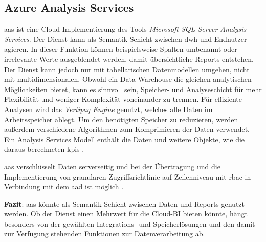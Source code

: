 \subsection{Azure Analysis Services} \label{sec:grundlagen:azure_dienste:analysisServices}
\ac{aas} ist eine Cloud Implementierung des Tools \textit{Microsoft SQL Server Analysis Services}. Der Dienst kann als Semantik-Schicht zwischen \ac{dwh} und Endnutzer agieren. In dieser Funktion können beispielsweise Spalten umbenannt oder irrelevante Werte ausgeblendet werden, damit übersichtliche Reports entstehen. Der Dienst kann jedoch nur mit tabellarischen Datenmodellen umgehen, nicht mit multidimensionalen. Obwohl ein Data Warehouse die gleichen analytischen Möglichkeiten bietet, kann es sinnvoll sein, Speicher- und Analyseschicht für mehr Flexibilität und weniger Komplexität voneinander zu trennen. Für effiziente Analysen wird das \textit{Vertipaq Engine} genutzt, welches alle Daten im Arbeitsspeicher ablegt. Um den benötigten Speicher zu reduzieren, werden außerdem verschiedene Algorithmen zum Komprimieren der Daten verwendet. Ein Analysis Services Modell enthält die Daten und weitere Objekte, wie die daraus berechneten \acp{kpi} \cite{how_beyond_2020}.

\ac{aas} verschlüsselt Daten serverseitig und bei der Übertragung und die Implementierung von granularen Zugriffsrichtlinie auf Zeilenniveau mit \ac{rbac} in Verbindung mit dem \ac{aad} ist möglich \cite{msdoc_21_aas}.

\textbf{Fazit}: \ac{aas} könnte als Semantik-Schicht zwischen Daten und Reports genutzt werden. Ob der Dienst einen Mehrwert für die Cloud-BI bieten könnte, hängt besonders von der gewählten Integrations- und Speicherlösungen und den damit zur Verfügung stehenden Funktionen zur Datenverarbeitung ab.


